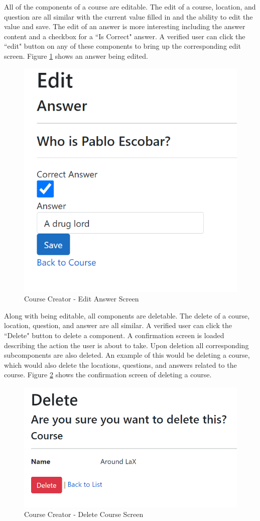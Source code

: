 All of the components of a course are editable. The edit of a course, location, and question are all similar with the current value filled in and the ability to edit the value and save. The edit of an answer is more interesting including the answer content and a checkbox for a ``Is Correct" answer. A verified user can click the ``edit" button on any of these components to bring up the corresponding edit screen. Figure \ref{CC Edit Answer} shows an answer being edited. 
\begin{figure}[htb]
	\centering
	\includegraphics[width=.5\textwidth]{Requirements/assets/cc-edit-answer.png}
	\caption[Course Creator - Edit Answer Screen]{\label{CC Edit Answer}Course Creator - Edit Answer Screen}
\end{figure}
Along with being editable, all components are deletable. The delete of a course, location, question, and answer are all similar. A verified user can click the ``Delete" button to delete a component. A confirmation screen is loaded describing the action the user is about to take. Upon deletion all corresponding subcomponents are also deleted. An example of this would be deleting a course, which would also delete the locations, questions, and answers related to the course. Figure \ref{CC Delete Course} shows the confirmation screen of deleting a course.
\begin{figure}[htb]
	\centering
	\includegraphics[width=.5\textwidth]{Requirements/assets/cc-delete-course.png}
	\caption[Course Creator - Delete Course Screen]{\label{CC Delete Course}Course Creator - Delete Course Screen}
\end{figure}
